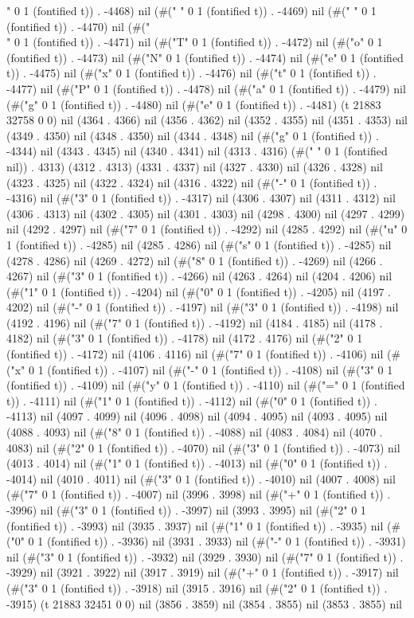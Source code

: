 " 0 1 (fontified t)) . -4468) nil (#("	" 0 1 (fontified t)) . -4469) nil (#(" " 0 1 (fontified t)) . -4470) nil (#("\\" 0 1 (fontified t)) . -4471) nil (#("T" 0 1 (fontified t)) . -4472) nil (#("o" 0 1 (fontified t)) . -4473) nil (#("N" 0 1 (fontified t)) . -4474) nil (#("e" 0 1 (fontified t)) . -4475) nil (#("x" 0 1 (fontified t)) . -4476) nil (#("t" 0 1 (fontified t)) . -4477) nil (#("P" 0 1 (fontified t)) . -4478) nil (#("a" 0 1 (fontified t)) . -4479) nil (#("g" 0 1 (fontified t)) . -4480) nil (#("e" 0 1 (fontified t)) . -4481) (t 21883 32758 0 0) nil (4364 . 4366) nil (4356 . 4362) nil (4352 . 4355) nil (4351 . 4353) nil (4349 . 4350) nil (4348 . 4350) nil (4344 . 4348) nil (#("g" 0 1 (fontified t)) . -4344) nil (4343 . 4345) nil (4340 . 4341) nil (4313 . 4316) (#(" " 0 1 (fontified nil)) . 4313) (4312 . 4313) (4331 . 4337) nil (4327 . 4330) nil (4326 . 4328) nil (4323 . 4325) nil (4322 . 4324) nil (4316 . 4322) nil (#("-" 0 1 (fontified t)) . -4316) nil (#("3" 0 1 (fontified t)) . -4317) nil (4306 . 4307) nil (4311 . 4312) nil (4306 . 4313) nil (4302 . 4305) nil (4301 . 4303) nil (4298 . 4300) nil (4297 . 4299) nil (4292 . 4297) nil (#("7" 0 1 (fontified t)) . -4292) nil (4285 . 4292) nil (#("u" 0 1 (fontified t)) . -4285) nil (4285 . 4286) nil (#("s" 0 1 (fontified t)) . -4285) nil (4278 . 4286) nil (4269 . 4272) nil (#("8" 0 1 (fontified t)) . -4269) nil (4266 . 4267) nil (#("3" 0 1 (fontified t)) . -4266) nil (4263 . 4264) nil (4204 . 4206) nil (#("1" 0 1 (fontified t)) . -4204) nil (#("0" 0 1 (fontified t)) . -4205) nil (4197 . 4202) nil (#("-" 0 1 (fontified t)) . -4197) nil (#("3" 0 1 (fontified t)) . -4198) nil (4192 . 4196) nil (#("7" 0 1 (fontified t)) . -4192) nil (4184 . 4185) nil (4178 . 4182) nil (#("3" 0 1 (fontified t)) . -4178) nil (4172 . 4176) nil (#("2" 0 1 (fontified t)) . -4172) nil (4106 . 4116) nil (#("7" 0 1 (fontified t)) . -4106) nil (#("x" 0 1 (fontified t)) . -4107) nil (#("-" 0 1 (fontified t)) . -4108) nil (#("3" 0 1 (fontified t)) . -4109) nil (#("y" 0 1 (fontified t)) . -4110) nil (#("=" 0 1 (fontified t)) . -4111) nil (#("1" 0 1 (fontified t)) . -4112) nil (#("0" 0 1 (fontified t)) . -4113) nil (4097 . 4099) nil (4096 . 4098) nil (4094 . 4095) nil (4093 . 4095) nil (4088 . 4093) nil (#("8" 0 1 (fontified t)) . -4088) nil (4083 . 4084) nil (4070 . 4083) nil (#("2" 0 1 (fontified t)) . -4070) nil (#("3" 0 1 (fontified t)) . -4073) nil (4013 . 4014) nil (#("1" 0 1 (fontified t)) . -4013) nil (#("0" 0 1 (fontified t)) . -4014) nil (4010 . 4011) nil (#("3" 0 1 (fontified t)) . -4010) nil (4007 . 4008) nil (#("7" 0 1 (fontified t)) . -4007) nil (3996 . 3998) nil (#("+" 0 1 (fontified t)) . -3996) nil (#("3" 0 1 (fontified t)) . -3997) nil (3993 . 3995) nil (#("2" 0 1 (fontified t)) . -3993) nil (3935 . 3937) nil (#("1" 0 1 (fontified t)) . -3935) nil (#("0" 0 1 (fontified t)) . -3936) nil (3931 . 3933) nil (#("-" 0 1 (fontified t)) . -3931) nil (#("3" 0 1 (fontified t)) . -3932) nil (3929 . 3930) nil (#("7" 0 1 (fontified t)) . -3929) nil (3921 . 3922) nil (3917 . 3919) nil (#("+" 0 1 (fontified t)) . -3917) nil (#("3" 0 1 (fontified t)) . -3918) nil (3915 . 3916) nil (#("2" 0 1 (fontified t)) . -3915) (t 21883 32451 0 0) nil (3856 . 3859) nil (3854 . 3855) nil (3853 . 3855) nil 